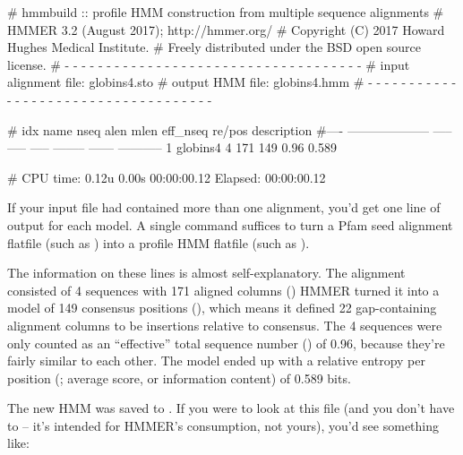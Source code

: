 \begin{samepage}
\begin{sreoutput}
# hmmbuild :: profile HMM construction from multiple sequence alignments
# HMMER 3.2 (August 2017); http://hmmer.org/
# Copyright (C) 2017 Howard Hughes Medical Institute.
# Freely distributed under the BSD open source license.
# - - - - - - - - - - - - - - - - - - - - - - - - - - - - - - - - - - - -
# input alignment file:             globins4.sto
# output HMM file:                  globins4.hmm
# - - - - - - - - - - - - - - - - - - - - - - - - - - - - - - - - - - - -

# idx name                  nseq  alen  mlen eff_nseq re/pos description
#---- -------------------- ----- ----- ----- -------- ------ -----------
1     globins4                 4   171   149     0.96  0.589 

# CPU time: 0.12u 0.00s 00:00:00.12 Elapsed: 00:00:00.12
\end{sreoutput}
\end{samepage}

If your input file had contained more than one alignment, you'd get
one line of output for each model. A single  command
suffices to turn a Pfam seed alignment flatfile (such as
) into a profile HMM flatfile (such as
).

The information on these lines is almost self-explanatory. The
 alignment consisted of 4 sequences with 171 aligned
columns () HMMER turned it into a model of 149 consensus
positions (), which means it defined 22 gap-containing
alignment columns to be insertions relative to consensus. The 4
sequences were only counted as an ``effective'' total sequence number
() of 0.96, because they're fairly similar to each
other. The model ended up with a relative entropy per position
(; average score, or information content) of 0.589 bits.

The new HMM was saved to . If you were to look at
this file (and you don't have to -- it's intended for HMMER's
consumption, not yours), you'd see something like:

